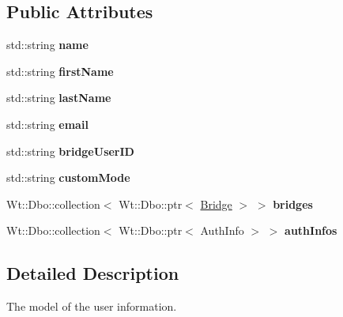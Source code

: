 \subsection*{Public Attributes}
\begin{DoxyCompactItemize}
\item 
std\+::string {\bfseries name}\hypertarget{classUser_a085d8d69282b6298964eab8351584536}{}\label{classUser_a085d8d69282b6298964eab8351584536}

\item 
std\+::string {\bfseries first\+Name}\hypertarget{classUser_aa845739b31aaf9d2e7bdedf829447191}{}\label{classUser_aa845739b31aaf9d2e7bdedf829447191}

\item 
std\+::string {\bfseries last\+Name}\hypertarget{classUser_a10abe0efedb0a600a7be16593a448b12}{}\label{classUser_a10abe0efedb0a600a7be16593a448b12}

\item 
std\+::string {\bfseries email}\hypertarget{classUser_ac35b7c63228119cb91acdbd7ed32b8cb}{}\label{classUser_ac35b7c63228119cb91acdbd7ed32b8cb}

\item 
std\+::string {\bfseries bridge\+User\+ID}\hypertarget{classUser_aab2b993a0e6512bed3f637338f48d9ac}{}\label{classUser_aab2b993a0e6512bed3f637338f48d9ac}

\item 
std\+::string {\bfseries custom\+Mode}\hypertarget{classUser_a044edce65486d14cfed5f97c753f9d7c}{}\label{classUser_a044edce65486d14cfed5f97c753f9d7c}

\item 
Wt\+::\+Dbo\+::collection$<$ Wt\+::\+Dbo\+::ptr$<$ \hyperlink{classBridge}{Bridge} $>$ $>$ {\bfseries bridges}\hypertarget{classUser_a19170eac8428770570d1e0b826562131}{}\label{classUser_a19170eac8428770570d1e0b826562131}

\item 
Wt\+::\+Dbo\+::collection$<$ Wt\+::\+Dbo\+::ptr$<$ Auth\+Info $>$ $>$ {\bfseries auth\+Infos}\hypertarget{classUser_ae3f58fe31642f514288705f4081031b6}{}\label{classUser_ae3f58fe31642f514288705f4081031b6}

\end{DoxyCompactItemize}


\subsection{Detailed Description}
The model of the user information. 

